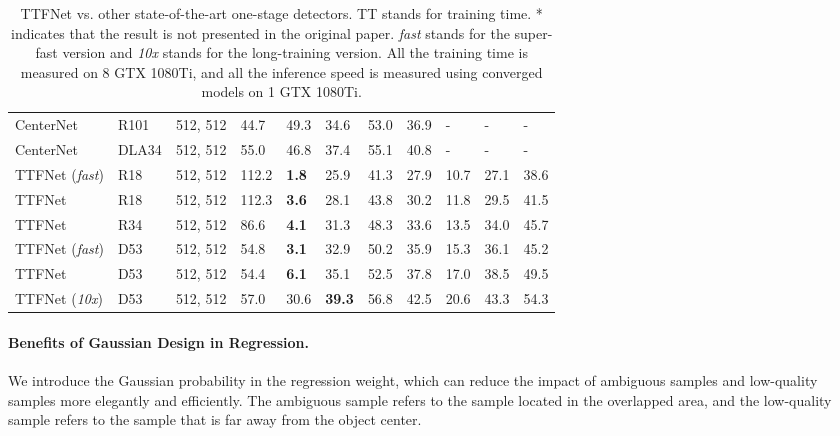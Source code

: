 \documentclass[letterpaper]{article} \usepackage{aaai20}  \usepackage{times}  \usepackage{helvet} \usepackage{courier}  \usepackage[hyphens]{url}  \usepackage{graphicx} \urlstyle{rm} \def\UrlFont{\rm}  \usepackage{graphicx}  \frenchspacing  \setlength{\pdfpagewidth}{8.5in}  \setlength{\pdfpageheight}{11in}  \usepackage{subcaption}
\begin{document}
\begin{table*}[tbp]
{\begin{tabular}{lllllllllll}
CenterNet \cite{DBLP:journals/corr/abs-1904-07850}         & R101     & 512, 512  & 44.7            & 49.3           & 34.6 & 53.0 & 36.9 & -    & -    & -   \\
CenterNet \cite{DBLP:journals/corr/abs-1904-07850}         & DLA34     & 512, 512  & 55.0            & 46.8           & 37.4 & 55.1 & 40.8 & -    & -    & -   \\
\hline
TTFNet (\textit{fast})             & R18      & 512, 512  & 112.2           & \textbf{1.8}            & 25.9 & 41.3 & 27.9 & 10.7 & 27.1 & 38.6 \\
TTFNet             & R18      & 512, 512  & 112.3           & \textbf{3.6}            & 28.1 & 43.8 & 30.2 & 11.8 & 29.5 & 41.5  \\
TTFNet             & R34      & 512, 512  & 86.6            & \textbf{4.1}            & 31.3 & 48.3 & 33.6 & 13.5 & 34.0 & 45.7 \\
TTFNet (\textit{fast})       & D53      & 512, 512  & 54.8            & \textbf{3.1}            & 32.9 & 50.2 & 35.9 & 15.3 & 36.1 & 45.2 \\
TTFNet             & D53      & 512, 512  & 54.4            & \textbf{6.1}            & 35.1 & 52.5 & 37.8 & 17.0 & 38.5 & 49.5 \\
TTFNet (\textit{10x})            & D53      & 512, 512  & 57.0            & 30.6            & \textbf{39.3} & 56.8 & 42.5 & 20.6 & 43.3 & 54.3 \\
\hline
\end{tabular}}
\caption{TTFNet vs. other state-of-the-art one-stage detectors. TT stands for training time. * indicates that the result is not presented in the original paper. \textit{fast} stands for the super-fast version and \textit{10x} stands for the long-training version. All the training time is measured on 8 GTX 1080Ti, and all the inference speed is measured using converged models on 1 GTX 1080Ti.}
\label{compare}
\end{table*}

\paragraph{Benefits of Gaussian Design in Regression.} We introduce the Gaussian probability in the regression weight, which can reduce the impact of ambiguous samples and low-quality samples more elegantly and efficiently. The ambiguous sample refers to the sample located in the overlapped area, and the low-quality sample refers to the sample that is far away from the object center. 
\end{document}
